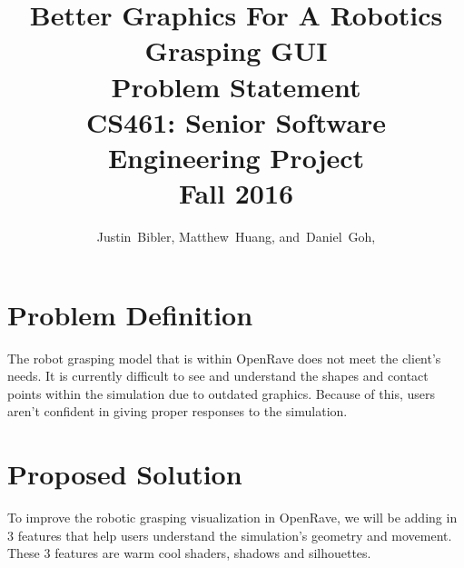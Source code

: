 \documentclass[10pt,journal,compsoc]{IEEEtran}
\begin{document}
\onecolumn
\begin{titlepage}
\title{Better Graphics For A Robotics Grasping GUI\\ Problem Statement \\  [0.5em] 
	\large CS461: Senior Software Engineering Project \\ Fall 2016}

\author{Justin~Bibler,
        Matthew~Huang,
        and~Daniel~Goh,}
		

\maketitle

\end{titlepage}

\section{Problem Definition}
The robot grasping model that is within OpenRave does not meet the client’s needs.
It is currently difficult to see and understand the shapes and contact points within the simulation due to outdated graphics.
Because of this, users aren’t confident in giving proper responses to the simulation.

\section{Proposed Solution}
To improve the robotic grasping visualization in OpenRave, we will be adding in 3 features that help users understand the simulation’s geometry and movement. 
These 3 features are warm cool shaders, shadows and silhouettes. \par
\end{document}

